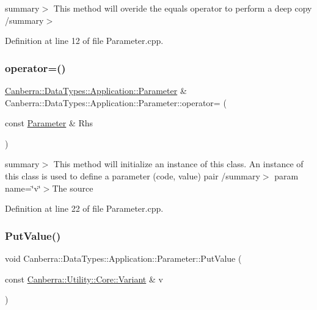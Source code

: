 summary$>$ This method will overide the equals operator to perform a deep copy /summary$>$ 

Definition at line 12 of file Parameter.\+cpp.

\mbox{\label{class_canberra_1_1_data_types_1_1_application_1_1_parameter_a9957ddd72a7094629242cd334978c375_a9957ddd72a7094629242cd334978c375}} 
\subsubsection{\texorpdfstring{operator=()}{operator=()}}
{\footnotesize\ttfamily \hyperlink{class_canberra_1_1_data_types_1_1_application_1_1_parameter}{Canberra\+::\+Data\+Types\+::\+Application\+::\+Parameter} \& Canberra\+::\+Data\+Types\+::\+Application\+::\+Parameter\+::operator= (\begin{DoxyParamCaption}\item[{const \hyperlink{class_canberra_1_1_data_types_1_1_application_1_1_parameter}{Parameter} \&}]{Rhs }\end{DoxyParamCaption})}

summary$>$ This method will initialize an instance of this class. An instance of this class is used to define a parameter (code, value) pair /summary$>$ param name=\char`\"{}v\char`\"{}$>$The source

Definition at line 22 of file Parameter.\+cpp.

\mbox{\label{class_canberra_1_1_data_types_1_1_application_1_1_parameter_ad9c7e6dc5d9229c776441b8c04be489c_ad9c7e6dc5d9229c776441b8c04be489c}} 
\subsubsection{\texorpdfstring{Put\+Value()}{PutValue()}}
{\footnotesize\ttfamily void Canberra\+::\+Data\+Types\+::\+Application\+::\+Parameter\+::\+Put\+Value (\begin{DoxyParamCaption}\item[{const \hyperlink{class_canberra_1_1_utility_1_1_core_1_1_variant}{Canberra\+::\+Utility\+::\+Core\+::\+Variant} \&}]{v }\end{DoxyParamCaption})}

